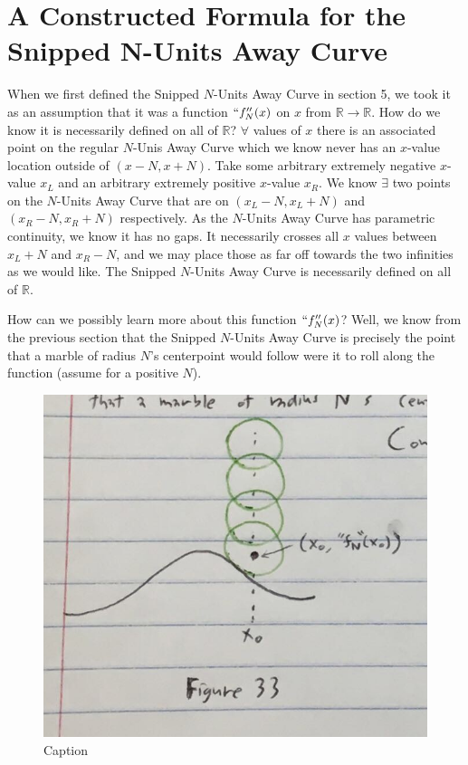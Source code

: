 \section{A Constructed Formula for the Snipped N-Units Away Curve}

When we first defined the Snipped $N$-Units Away Curve in section 5, we took it as an assumption that it was a function $``f_N''(x)$ on $x$ from $\mathbb{R} \xrightarrow{} \mathbb{R}$. How do we know it is necessarily defined on all of $\mathbb{R}$? $\forall$ values of $x$ there is an associated point on the regular $N$-Unis Away Curve which we know never has an $x$-value location outside of $(x - N, x + N)$. Take some arbitrary extremely negative $x$-value $x_L$ and an arbitrary extremely positive $x$-value $x_R$. We know $\exists$ two points on the $N$-Units Away Curve that are on $(x_L - N, x_L + N)$ and $(x_R - N, x_R + N)$ respectively. As the $N$-Units Away Curve has parametric continuity, we know it has no gaps. It necessarily crosses all $x$ values between $x_L + N$ and $x_R - N$, and we  may place those as far off towards the two infinities as we would like. The Snipped $N$-Units Away Curve is necessarily defined on all of $\mathbb{R}$.

How can we possibly learn more about this function $``f_N''(x)$? Well, we know from the previous section that the Snipped $N$-Units Away Curve is precisely the point that a marble of radius $N$'s centerpoint would follow were it to roll along the function (assume for a positive $N$).

\renewcommand\w{0.35\linewidth}
\renewcommand\fw{0.9\linewidth}

\begin{figure}
  \label{constructed:1}
  \includegraphics[width=\fw]{img/10-constructed/01.png}
  \caption{Caption}
\end{figure}

